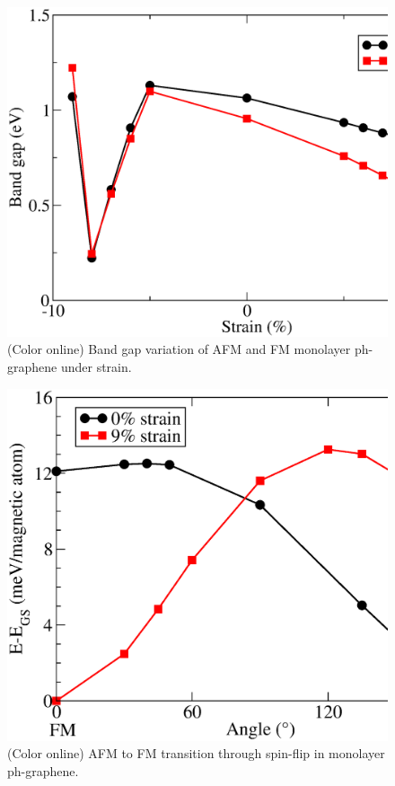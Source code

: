 \begin{figure}[htbp]
\centering
\includegraphics[width=\linewidth]{FM_AFM_Eg.eps}%
\caption{ (Color online) Band gap variation of AFM and FM monolayer ph-graphene under strain. \label{bandgap}}
\end{figure}
\begin{figure}[htbp]
\centering
\includegraphics[width=\linewidth]{AFM_AFM_barrier.eps}%
\caption{ (Color online) AFM to FM transition through spin-flip in monolayer ph-graphene. \label{spinflip} }
\end{figure}

